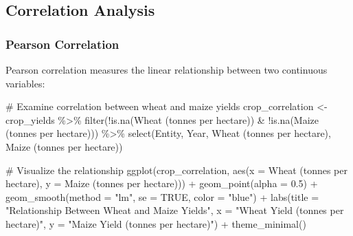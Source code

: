 \documentclass[
  letterpaper,
]{book}
\newenvironment{Shaded}{\begin{snugshade}}{\end{snugshade}}
\newcommand{\AttributeTok}[1]{\textcolor[rgb]{0.40,0.45,0.13}{#1}}
\newcommand{\CommentTok}[1]{\textcolor[rgb]{0.37,0.37,0.37}{#1}}
\newcommand{\ConstantTok}[1]{\textcolor[rgb]{0.56,0.35,0.01}{#1}}
\newcommand{\FloatTok}[1]{\textcolor[rgb]{0.68,0.00,0.00}{#1}}
\newcommand{\FunctionTok}[1]{\textcolor[rgb]{0.28,0.35,0.67}{#1}}
\newcommand{\NormalTok}[1]{\textcolor[rgb]{0.00,0.23,0.31}{#1}}
\newcommand{\OtherTok}[1]{\textcolor[rgb]{0.00,0.23,0.31}{#1}}
\newcommand{\SpecialCharTok}[1]{\textcolor[rgb]{0.37,0.37,0.37}{#1}}
\newcommand{\StringTok}[1]{\textcolor[rgb]{0.13,0.47,0.30}{#1}}
\begin{document}
\subsection{Correlation Analysis}\label{correlation-analysis-1}

\subsubsection{Pearson Correlation}\label{pearson-correlation}

Pearson correlation measures the linear relationship between two
continuous variables:

\begin{Shaded}
\begin{Highlighting}[]
\CommentTok{\# Examine correlation between wheat and maize yields}
\NormalTok{crop\_correlation }\OtherTok{\textless{}{-}}\NormalTok{ crop\_yields }\SpecialCharTok{\%\textgreater{}\%}
  \FunctionTok{filter}\NormalTok{(}\SpecialCharTok{!}\FunctionTok{is.na}\NormalTok{(}\StringTok{\textasciigrave{}}\AttributeTok{Wheat (tonnes per hectare)}\StringTok{\textasciigrave{}}\NormalTok{) }\SpecialCharTok{\&} \SpecialCharTok{!}\FunctionTok{is.na}\NormalTok{(}\StringTok{\textasciigrave{}}\AttributeTok{Maize (tonnes per hectare)}\StringTok{\textasciigrave{}}\NormalTok{)) }\SpecialCharTok{\%\textgreater{}\%}
  \FunctionTok{select}\NormalTok{(Entity, Year, }\StringTok{\textasciigrave{}}\AttributeTok{Wheat (tonnes per hectare)}\StringTok{\textasciigrave{}}\NormalTok{, }\StringTok{\textasciigrave{}}\AttributeTok{Maize (tonnes per hectare)}\StringTok{\textasciigrave{}}\NormalTok{)}

\CommentTok{\# Visualize the relationship}
\FunctionTok{ggplot}\NormalTok{(crop\_correlation, }\FunctionTok{aes}\NormalTok{(}\AttributeTok{x =} \StringTok{\textasciigrave{}}\AttributeTok{Wheat (tonnes per hectare)}\StringTok{\textasciigrave{}}\NormalTok{, }\AttributeTok{y =} \StringTok{\textasciigrave{}}\AttributeTok{Maize (tonnes per hectare)}\StringTok{\textasciigrave{}}\NormalTok{)) }\SpecialCharTok{+}
  \FunctionTok{geom\_point}\NormalTok{(}\AttributeTok{alpha =} \FloatTok{0.5}\NormalTok{) }\SpecialCharTok{+}
  \FunctionTok{geom\_smooth}\NormalTok{(}\AttributeTok{method =} \StringTok{"lm"}\NormalTok{, }\AttributeTok{se =} \ConstantTok{TRUE}\NormalTok{, }\AttributeTok{color =} \StringTok{"blue"}\NormalTok{) }\SpecialCharTok{+}
  \FunctionTok{labs}\NormalTok{(}\AttributeTok{title =} \StringTok{"Relationship Between Wheat and Maize Yields"}\NormalTok{,}
       \AttributeTok{x =} \StringTok{"Wheat Yield (tonnes per hectare)"}\NormalTok{,}
       \AttributeTok{y =} \StringTok{"Maize Yield (tonnes per hectare)"}\NormalTok{) }\SpecialCharTok{+}
  \FunctionTok{theme\_minimal}\NormalTok{()}
\end{Highlighting}
\end{Shaded}
\end{document}
